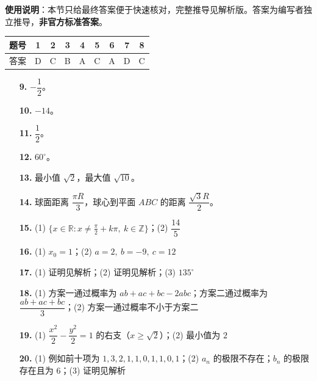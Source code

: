 
\begin{gknotice}
\textbf{使用说明}：本节只给最终答案便于快速核对，完整推导见解析版。答案为编写者独立推导，\textbf{非官方标准答案}。
\end{gknotice}

\begin{center}\begin{tabular}{ccccccccc}
\toprule
题号 & 1 & 2 & 3 & 4 & 5 & 6 & 7 & 8 \\
\midrule
答案 & D & C & B & A & C & A & D & C \\
\bottomrule
\end{tabular}\end{center}

\begin{itemize}[leftmargin=2.6em]
  \item[\textbf{9.}] $-\dfrac12$。
  \item[\textbf{10.}] $-14$。
  \item[\textbf{11.}] $\dfrac12$。
  \item[\textbf{12.}] $60^\circ$。
  \item[\textbf{13.}] 最小值 $\sqrt2$，最大值 $\sqrt{10}$。
  \item[\textbf{14.}] 球面距离 $\dfrac{\pi R}{3}$，球心到平面 $ABC$ 的距离 $\dfrac{\sqrt3R}{2}$。
\end{itemize}

\begin{itemize}[leftmargin=2.6em]
  \item[\textbf{15.}] (1) $\{x\in\mathbb R:x\ne\frac\pi2+k\pi,\ k\in\mathbb Z\}$；(2) $\dfrac{14}{5}$
  \item[\textbf{16.}] (1) $x_0=1$；(2) $a=2,\ b=-9,\ c=12$
  \item[\textbf{17.}] (1) 证明见解析；(2) 证明见解析；(3) $135^\circ$
  \item[\textbf{18.}] (1) 方案一通过概率为 $ab+ac+bc-2abc$；方案二通过概率为 $\dfrac{ab+ac+bc}{3}$；(2) 方案一通过概率不小于方案二
  \item[\textbf{19.}] (1) $\dfrac{x^2}{2}-\dfrac{y^2}{2}=1$ 的右支（$x\ge\sqrt2$）；(2) 最小值为 $2$
  \item[\textbf{20.}] (1) 例如前十项为 $1,3,2,1,1,0,1,1,0,1$；(2) $a_n$ 的极限不存在；$b_n$ 的极限存在且为 $6$；(3) 证明见解析
\end{itemize}
